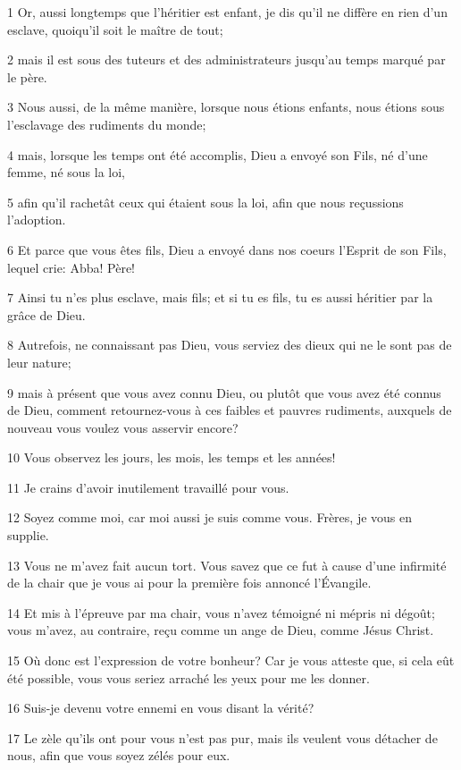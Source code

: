 \par 1 Or, aussi longtemps que l'héritier est enfant, je dis qu'il ne diffère en rien d'un esclave, quoiqu'il soit le maître de tout;
\par 2 mais il est sous des tuteurs et des administrateurs jusqu'au temps marqué par le père.
\par 3 Nous aussi, de la même manière, lorsque nous étions enfants, nous étions sous l'esclavage des rudiments du monde;
\par 4 mais, lorsque les temps ont été accomplis, Dieu a envoyé son Fils, né d'une femme, né sous la loi,
\par 5 afin qu'il rachetât ceux qui étaient sous la loi, afin que nous reçussions l'adoption.
\par 6 Et parce que vous êtes fils, Dieu a envoyé dans nos coeurs l'Esprit de son Fils, lequel crie: Abba! Père!
\par 7 Ainsi tu n'es plus esclave, mais fils; et si tu es fils, tu es aussi héritier par la grâce de Dieu.
\par 8 Autrefois, ne connaissant pas Dieu, vous serviez des dieux qui ne le sont pas de leur nature;
\par 9 mais à présent que vous avez connu Dieu, ou plutôt que vous avez été connus de Dieu, comment retournez-vous à ces faibles et pauvres rudiments, auxquels de nouveau vous voulez vous asservir encore?
\par 10 Vous observez les jours, les mois, les temps et les années!
\par 11 Je crains d'avoir inutilement travaillé pour vous.
\par 12 Soyez comme moi, car moi aussi je suis comme vous. Frères, je vous en supplie.
\par 13 Vous ne m'avez fait aucun tort. Vous savez que ce fut à cause d'une infirmité de la chair que je vous ai pour la première fois annoncé l'Évangile.
\par 14 Et mis à l'épreuve par ma chair, vous n'avez témoigné ni mépris ni dégoût; vous m'avez, au contraire, reçu comme un ange de Dieu, comme Jésus Christ.
\par 15 Où donc est l'expression de votre bonheur? Car je vous atteste que, si cela eût été possible, vous vous seriez arraché les yeux pour me les donner.
\par 16 Suis-je devenu votre ennemi en vous disant la vérité?
\par 17 Le zèle qu'ils ont pour vous n'est pas pur, mais ils veulent vous détacher de nous, afin que vous soyez zélés pour eux.
